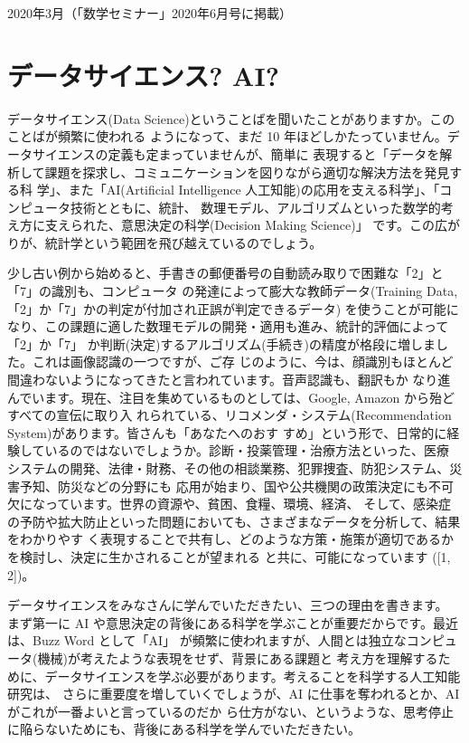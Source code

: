 \documentclass[
]{book}
\theoremstyle{definition}
\theoremstyle{definition}
\theoremstyle{definition}
\theoremstyle{definition}
\theoremstyle{remark}
\begin{document}
2020年3月（「数学セミナー」2020年6月号に掲載）

\hypertarget{ux30c7ux30fcux30bfux30b5ux30a4ux30a8ux30f3ux30b9-ai}{%
\section{データサイエンス? AI?}\label{ux30c7ux30fcux30bfux30b5ux30a4ux30a8ux30f3ux30b9-ai}}

データサイエンス(Data Science)ということばを聞いたことがありますか。このことばが頻繁に使われる ようになって、まだ 10 年ほどしかたっていません。データサイエンスの定義も定まっていませんが、簡単に 表現すると「データを解析して課題を探求し、コミュニケーションを図りながら適切な解決方法を発見する科 学」、また「AI(Artificial Intelligence 人工知能)の応用を支える科学」、「コンピュータ技術とともに、統計、 数理モデル、アルゴリズムといった数学的考え方に支えられた、意思決定の科学(Decision Making Science)」 です。この広がりが、統計学という範囲を飛び越えているのでしょう。

少し古い例から始めると、手書きの郵便番号の自動読み取りで困難な「2」と「7」の識別も、コンピュータ の発達によって膨大な教師データ(Training Data,「2」か「7」かの判定が付加され正誤が判定できるデータ) を使うことが可能になり、この課題に適した数理モデルの開発・適用も進み、統計的評価によって「2」か「7」 か判断(決定)するアルゴリズム(手続き)の精度が格段に増しました。これは画像認識の一つですが、ご存 じのように、今は、顔識別もほとんど間違わないようになってきたと言われています。音声認識も、翻訳もか なり進んでいます。現在、注目を集めているものとしては、Google, Amazon から殆どすべての宣伝に取り入 れられている、リコメンダ・システム(Recommendation System)があります。皆さんも「あなたへのおす すめ」という形で、日常的に経験しているのではないでしょうか。診断・投薬管理・治療方法といった、医療 システムの開発、法律・財務、その他の相談業務、犯罪捜査、防犯システム、災害予知、防災などの分野にも 応用が始まり、国や公共機関の政策決定にも不可欠になっています。世界の資源や、貧困、食糧、環境、経済、 そして、感染症の予防や拡大防止といった問題においても、さまざまなデータを分析して、結果をわかりやす く表現することで共有し、どのような方策・施策が適切であるかを検討し、決定に生かされることが望まれる と共に、可能になっています ({[}1, 2{]})。

データサイエンスをみなさんに学んでいただきたい、三つの理由を書きます。
まず第一に AI や意思決定の背後にある科学を学ぶことが重要だからです。最近は、Buzz Word として「AI」 が頻繁に使われますが、人間とは独立なコンピュータ(機械)が考えたような表現をせず、背景にある課題と 考え方を理解するために、データサイエンスを学ぶ必要があります。考えることを科学する人工知能研究は、 さらに重要度を増していくでしょうが、AI に仕事を奪われるとか、AI がこれが一番よいと言っているのだか ら仕方がない、というような、思考停止に陥らないためにも、背後にある科学を学んでいただきたい。
\end{document}
